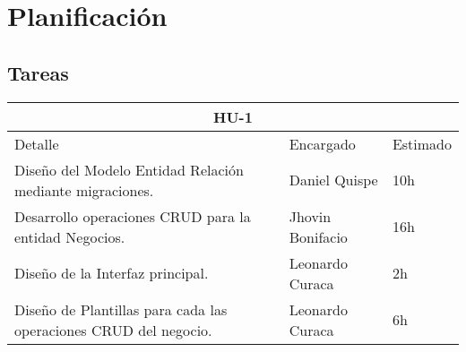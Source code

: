 \chapter{Planificación}
\section{Tareas}
\begin{table}[htbp]
	\begin{center}
		\begin{tabular}{|p{10cm} | p{3.2cm} | p{1.8cm}|}
			\hline
			\multicolumn{3}{|c|}{HU-1}\\
			\hline
			Detalle & Encargado & Estimado \\
			\hline
			Diseño del Modelo Entidad Relación mediante migraciones. & Daniel Quispe & 10h \\
			\hline
			Desarrollo operaciones CRUD para la entidad Negocios. & Jhovin Bonifacio & 16h \\
			\hline
			Diseño de la Interfaz principal. & Leonardo Curaca & 2h \\
			\hline
			Diseño de Plantillas para cada las operaciones CRUD del negocio. & Leonardo Curaca & 6h \\
			\hline	
		\end{tabular}
	\end{center}
\end{table}